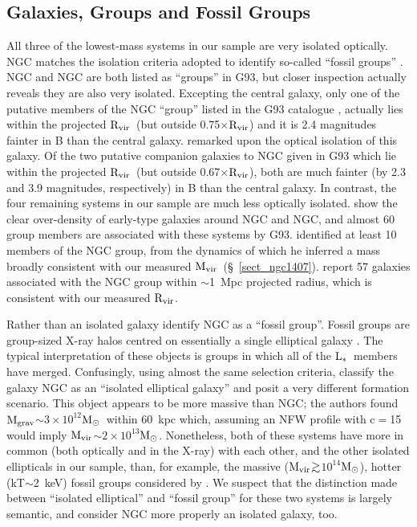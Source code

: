 \documentclass{emulateapj}
\def\spose#1{\hbox to 0pt{#1\hss}}
\def\gtsim{$\mathrel{\spose{\lower 3pt\hbox{$\sim$}} 
        \raise 2.0pt\hbox{$>$}}$\thinspace}
\def \msun {${\rm M_\odot}$}
\newcommand{\mvir}{${\rm M_{vir}}$}
\newcommand{\mgrav}{${\rm M_{grav}}$}
\newcommand{\rvir }{${\rm R_{vir}}$}
\newcommand{\lstar}{${\rm L_{*}}$}
\newcommand{\thin}{\thinspace}
\begin{document}
\subsection{Galaxies, Groups and Fossil Groups} \label{discussion_groups}
All three of the lowest-mass systems in our sample are very isolated
optically. NGC\thin 6482 matches the isolation criteria adopted
to identify so-called ``fossil groups'' \citep{khosroshahi04a}. 
NGC\thin 4125 and NGC\thin 720 are both listed as ``groups'' in 
G93, but closer inspection actually reveals they are also
very isolated. Excepting the central galaxy, only one of the putative
members of the NGC\thin 720 ``group'' listed in the G93
catalogue  \citep[which omits the dwarf galaxy population 
studied by][]{dressler86a},
actually lies within the projected \rvir\ (but outside 0.75$\times$\rvir)
and it is 2.4 magnitudes fainter in B than the central galaxy.
\citeauthor{dressler86a} remarked upon the optical isolation of this galaxy.
Of the two putative companion galaxies to NGC\thin 4125 given 
in G93 which lie within the projected \rvir\ (but outside 
0.67$\times$\rvir), both are much fainter (by 2.3 and 3.9 magnitudes,
respectively) in B than the central galaxy.
In contrast, the four remaining systems in our sample are much less
optically isolated. \citet{schindler99a} show the clear over-density of 
early-type galaxies around NGC\thin 4649 and NGC\thin 4472, and almost
60 group members are associated with these systems by G93.
\citet{gould93a} identified at least 10 members of the NGC\thin 1407
group, from the dynamics of which he inferred a mass broadly consistent
with our measured \mvir\ (\S~\ref{sect_ngc1407}).
\citet{helsdon03a} report 57 galaxies associated with the NGC\thin 4261
group within $\sim$1~Mpc projected radius, which is consistent with 
our measured \rvir. 


Rather than an isolated galaxy \citet{khosroshahi04a} identify NGC\thin 6482
as a ``fossil group''. Fossil groups are group-sized X-ray halos centred on 
essentially a 
single elliptical galaxy \citep{ponman94,vikhlinin99a,jones03}. The typical 
interpretation of these objects is groups in which all of the \lstar\ members 
have merged. Confusingly, using almost the same selection criteria,
 \citet{osullivan04b} classify the galaxy NGC\thin 4555 as an 
``isolated elliptical
galaxy'' and posit a very different formation scenario. 
This object appears to be more massive than NGC\thin 6482;
the authors found \mgrav $\sim 3\times 10^{12}$\msun\ within 60~kpc
which, assuming an NFW profile with c$=$15 would imply 
\mvir $\sim 2\times 10^{13}$\msun. 
Nonetheless, both of these systems have more in 
common (both optically and in the X-ray) 
with each other, and the other isolated ellipticals in our sample,
than, for example, the  massive (\mvir\gtsim$10^{14}$\msun), hotter (kT$\sim$2~keV)
fossil groups considered by \citet{vikhlinin99a}. 
We suspect that the distinction made between ``isolated elliptical'' and 
``fossil group'' for these two systems is largely semantic,
and consider NGC\thin 6482 more properly an isolated  galaxy, too.
\end{document}
